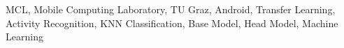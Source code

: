 \begin{IEEEkeywords}
MCL, Mobile Computing Laboratory, TU Graz, Android, Transfer Learning, Activity Recognition, KNN Classification, Base Model, Head Model, Machine Learning
\end{IEEEkeywords}